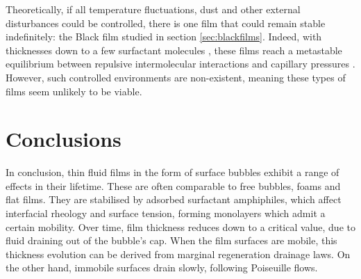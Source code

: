 \documentclass[a4paper,12pt]{article}
\numberwithin{equation}{section}
\numberwithin{figure}{section}
\numberwithin{table}{section}
\begin{document}
Theoretically, if all temperature fluctuations, dust and other external disturbances could be controlled, there is one film that could remain stable indefinitely: the Black film studied in section \ref{sec:blackfilms}. Indeed, with thicknesses down to a few surfactant molecules \cite{Casteletto2003}, these films reach a metastable equilibrium between repulsive intermolecular interactions and capillary pressures \cite{Breward2002, ChampougnyEvap2018, Cantat2010, Vrij1968, VrijDiscussion1966}. However, such controlled environments are non-existent, meaning these types of films seem unlikely to be viable.

\section{Conclusions}
In conclusion, thin fluid films in the form of surface bubbles exhibit a range of effects in their lifetime. These are often comparable to free bubbles, foams and flat films. They are stabilised by adsorbed surfactant amphiphiles, which affect interfacial rheology and surface tension, forming monolayers which admit a certain mobility. Over time, film thickness reduces down to a critical value, due to fluid draining out of the bubble's cap. When the film surfaces are mobile, this thickness evolution can be derived from marginal regeneration drainage laws. On the other hand, immobile surfaces drain slowly, following Poiseuille flows.



\newpage
\singlespacing





\end{document}
